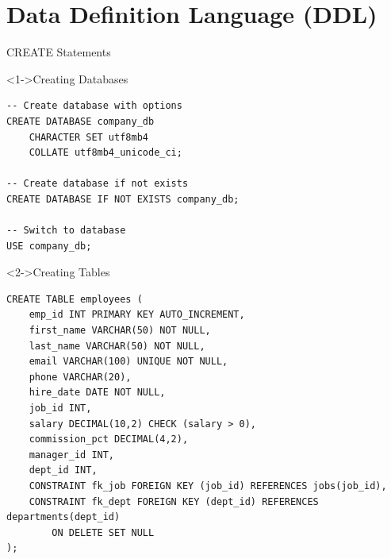 \documentclass[aspectratio=169,11pt]{beamer}
\begin{document}
\section{Data Definition Language (DDL)}

\begin{frame}[fragile]{CREATE Statements}
\begin{exampleblock}<1->{Creating Databases}
\begin{lstlisting}
-- Create database with options
CREATE DATABASE company_db
    CHARACTER SET utf8mb4
    COLLATE utf8mb4_unicode_ci;

-- Create database if not exists
CREATE DATABASE IF NOT EXISTS company_db;

-- Switch to database
USE company_db;
\end{lstlisting}
\end{exampleblock}

\pause
\begin{exampleblock}<2->{Creating Tables}
\begin{lstlisting}
CREATE TABLE employees (
    emp_id INT PRIMARY KEY AUTO_INCREMENT,
    first_name VARCHAR(50) NOT NULL,
    last_name VARCHAR(50) NOT NULL,
    email VARCHAR(100) UNIQUE NOT NULL,
    phone VARCHAR(20),
    hire_date DATE NOT NULL,
    job_id INT,
    salary DECIMAL(10,2) CHECK (salary > 0),
    commission_pct DECIMAL(4,2),
    manager_id INT,
    dept_id INT,
    CONSTRAINT fk_job FOREIGN KEY (job_id) REFERENCES jobs(job_id),
    CONSTRAINT fk_dept FOREIGN KEY (dept_id) REFERENCES departments(dept_id)
        ON DELETE SET NULL
);
\end{lstlisting}
\end{exampleblock}
\end{frame}
\end{document}
